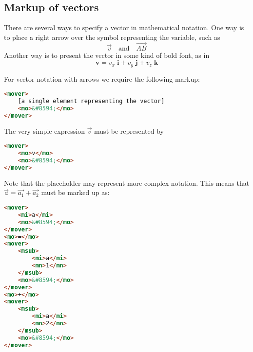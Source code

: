 \documentclass[english,a4paper,11pt]{article}
\begin{document}
\subsection{Markup of vectors}
There are several ways to specify a vector in mathematical notation. One way is to place a right arrow over the symbol representing the variable, such as 
\begin{equation}
\vec{v}\quad \text{and}\quad \overrightarrow{AB}
\end{equation}
Another way is to present the vector in some kind of bold font, as in 
\begin{equation}
\mathbf{v} = v_x\;  \mathbf{i} + v_y\; \mathbf{j} + v_z\;  \mathbf{k}
\end{equation}

\bigskip
For vector notation with arrows we require the following markup:
\begin{lstlisting}[language=HTML]
<mover>
	[a single element representing the vector]
	<mo>&#8594;</mo>
</mover>
\end{lstlisting}

\begin{eksempler}
The very simple expression $\vec{v}$ must be represented by
\begin{lstlisting}[language=HTML]
<mover>
	<mo>v</mo>
	<mo>&#8594;</mo>
</mover>
\end{lstlisting}
Note that the placeholder  may represent more complex notation. This means that $\vec{a} = \vec{a_1} + \vec{a_2}$ must be marked up as:
\begin{lstlisting}[language=HTML]
<mover>
	<mi>a</mi>
	<mo>&#8594;</mo>
</mover>
<mo>=</mo>
<mover>
	<msub>
		<mi>a</mi>
		<mn>1</mn>
	</msub>
	<mo>&#8594;</mo>
</mover>
<mo>+</mo>
<mover>
	<msub>
		<mi>a</mi>
		<mn>2</mn>
	</msub>
	<mo>&#8594;</mo>
</mover>
\end{lstlisting}
\end{eksempler}
\end{document}
